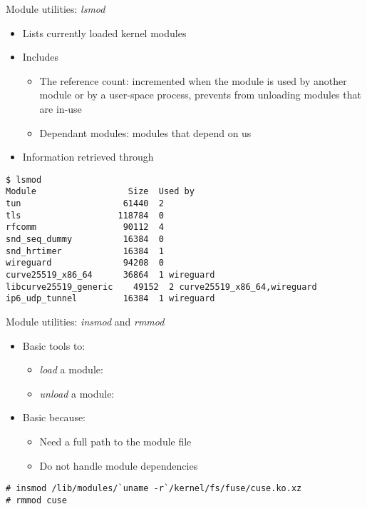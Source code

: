 \begin{frame}[fragile]{Module utilities: {\em lsmod}}

  \begin{itemize}
  \item Lists currently loaded kernel modules
  \item Includes
    \begin{itemize}
    \item The reference count: incremented when the module is used by
      another module or by a user-space process, prevents from unloading
      modules that are in-use
    \item Dependant modules: modules that depend on us
    \end{itemize}
  \item Information retrieved through 
  \end{itemize}

  \begin{block}{}
    {\footnotesize
\begin{verbatim}
$ lsmod
Module                  Size  Used by
tun                    61440  2
tls                   118784  0
rfcomm                 90112  4
snd_seq_dummy          16384  0
snd_hrtimer            16384  1
wireguard              94208  0
curve25519_x86_64      36864  1 wireguard
libcurve25519_generic    49152  2 curve25519_x86_64,wireguard
ip6_udp_tunnel         16384  1 wireguard
\end{verbatim}
    }
  \end{block}
\end{frame}

\begin{frame}[fragile]{Module utilities: {\em insmod} and {\em rmmod}}
  \begin{itemize}
  \item Basic tools to:
    \begin{itemize}
    \item {\em load} a module: 
    \item {\em unload} a module: 
    \end{itemize}
  \item Basic because:
    \begin{itemize}
    \item Need a full path to the module  file
    \item Do not handle module dependencies
    \end{itemize}
  \end{itemize}

  \begin{block}{}
    {\footnotesize
\begin{verbatim}
# insmod /lib/modules/`uname -r`/kernel/fs/fuse/cuse.ko.xz
# rmmod cuse
\end{verbatim}
    }
  \end{block}
\end{frame}

